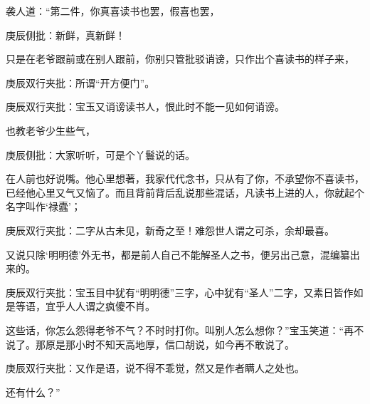 \begin{parag}


    袭人道：“第二件，你真喜读书也罢，假喜也罢，\begin{note}庚辰侧批：新鲜，真新鲜！\end{note}只是在老爷跟前或在别人跟前，你别只管批驳诮谤，只作出个喜读书的样子来，\begin{note}庚辰双行夹批：所谓“开方便门”。\end{note}\begin{note}庚辰双行夹批：宝玉又诮谤读书人，恨此时不能一见如何诮谤。\end{note}也教老爷少生些气，\begin{note}庚辰侧批：大家听听，可是个丫鬟说的话。\end{note}在人前也好说嘴。他心里想著，我家代代念书，只从有了你，不承望你不喜读书，已经他心里又气又恼了。而且背前背后乱说那些混话，凡读书上进的人，你就起个名字叫作‘禄蠹’；\begin{note}庚辰双行夹批：二字从古未见，新奇之至！难怨世人谓之可杀，余却最喜。\end{note}又说只除‘明明德’外无书，都是前人自己不能解圣人之书，便另出己意，混编纂出来的。\begin{note}庚辰双行夹批：宝玉目中犹有“明明德”三字，心中犹有“圣人”二字，又素日皆作如是等语，宜乎人人谓之疯傻不肖。\end{note}这些话，你怎么怨得老爷不气？不时时打你。叫别人怎么想你？”宝玉笑道：“再不说了。那原是那小时不知天高地厚，信口胡说，如今再不敢说了。\begin{note}庚辰双行夹批：又作是语，说不得不乖觉，然又是作者瞒人之处也。\end{note}还有什么？”
\end{parag}


